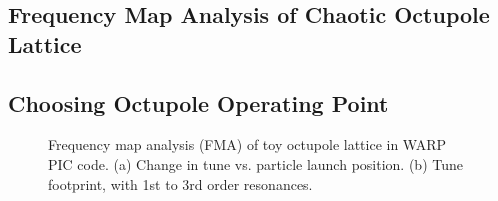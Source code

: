 \subsection{Frequency Map Analysis of Chaotic Octupole Lattice}


\subsection{Choosing Octupole Operating Point}

\begin{figure}[]
\centering
{}
\hspace{.5in}
\caption{Frequency map analysis (FMA) of toy octupole lattice in WARP PIC code. (a) Change in tune vs. particle launch position. (b) Tune footprint, with 1st to 3rd order resonances.}
\label{fig:toy-fma}
\end{figure}

